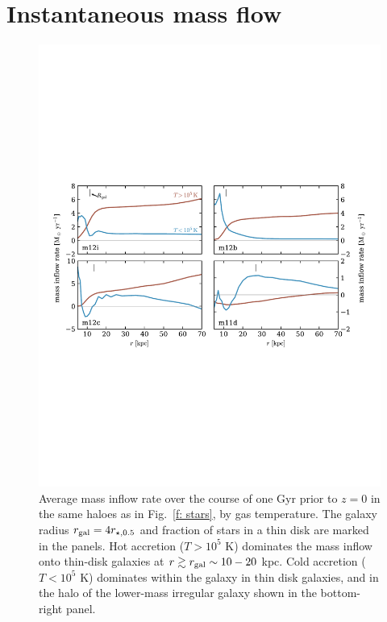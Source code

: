 \documentclass[fleqn,usenatbib]{mnras}
\begin{document}
\section{Instantaneous mass flow}
\label{s: appendix-mass flow}

\begin{figure}
    \centering
    \includegraphics[width=\textwidth]{figures/Mdot.pdf}
    \caption{
    Average mass inflow rate over the course of one Gyr prior to $z=0$ in the same haloes as in Fig.~\ref{f: stars}, by gas temperature.
    The galaxy radius $r_{\rm gal}=4 r_{\star,0.5}$ and fraction of stars in a thin disk are marked in the panels. 
    Hot accretion ($T>10^5$ K) dominates the mass inflow onto thin-disk galaxies at $r \gtrsim r_{\rm gal} \sim 10-20$ kpc.
    Cold accretion ($T<10^5$ K) dominates within the galaxy in thin disk galaxies, and in the halo of the lower-mass irregular galaxy shown in the bottom-right panel.
    }
    \label{f: Mdot}
\end{figure}
\end{document}
